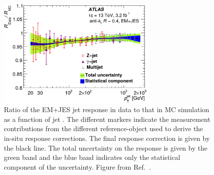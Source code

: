 \begin{figure}[!htb]
    \begin{center}
        \includegraphics[width=0.7\textwidth]{figures/chapter3/jets/jet_corr_insitu}
        \caption{
            Ratio of the EM+JES jet response in data to that in MC simulation as a function of jet \pT.
            The different markers indicate the measurement contributions from the different
            reference-object used to derive the in-situ response corrections.
            The final response correction is given by the black line.
            The total uncertainty on the response is given by the green band and the blue band
            indicates only the statistical component of the uncertainty.
            Figure from Ref.~\cite{Aaboud:2017jcu}.
        }
        \label{fig:jet_corr_insitu}
    \end{center}
\end{figure}
\FloatBarrier

